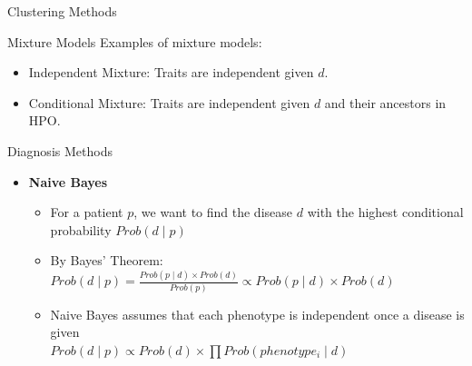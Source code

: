 \documentclass[final]{beamer} %
\begin{document}
\begin{frame}{}
\begin{columns}[T]
\begin{column}{0.3\linewidth}
\begin{block}{\Huge Clustering Methods}
\begin{block}{\Large Mixture Models}
			Examples of mixture models:
			\begin{itemize}
				\item Independent Mixture: Traits are independent given $d$.
				\item Conditional Mixture: Traits are independent given $d$ and their ancestors in HPO.
			\end{itemize}
		\end{block}
     \end{block}
     \vspace{3cm}
     \begin{block}{\Huge Diagnosis Methods}
   
     \begin{itemize}
      \item 
     \LARGE \textbf{Naive Bayes}

     \begin{itemize}
        \Large
    \item
    For a patient $p$, we want to find the disease $d$ with the highest conditional probability $Prob(d \mid p )$
  \vspace{1cm}
  \item
   By Bayes' Theorem: \\
   $Prob(d \mid p) = \frac{Prob(p \mid d) \times Prob(d)}{Prob(p)} \propto Prob(p \mid d) \times Prob(d)$
  \vspace{1cm}
   \item
   Naive Bayes assumes that each phenotype is independent once a disease is given \\
   $Prob(d \mid p) \propto Prob(d) \times \prod Prob(phenotype_i \mid d)$
     \end{itemize}
    \vspace{3cm}


\end{itemize}
\end{block}
\end{column}
\end{columns}
\end{frame}
\end{document}
